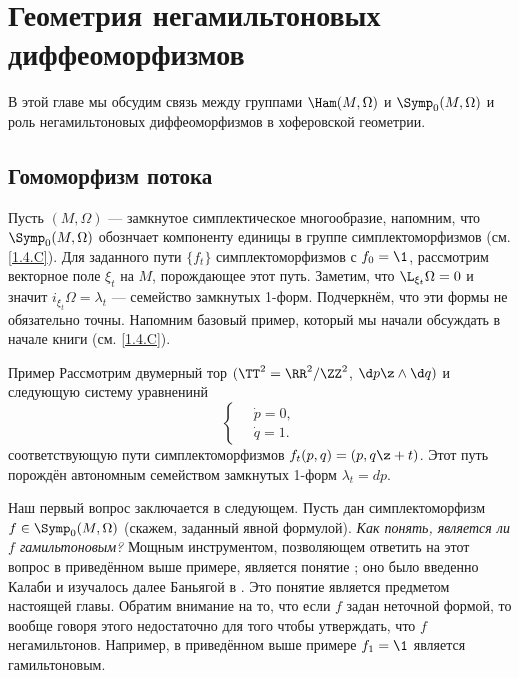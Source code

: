 \chapter[Негамильтоновы диффеоморфизмы]{Геометрия негамильтоновых диффеоморфизмов}\label{chap:14}

В этой главе мы обсудим связь между группами $\Ham(M,\Omega)$ и $\Symp_0(M,\Omega)$ и роль негамильтоновых диффеоморфизмов в хоферовской геометрии.

\section{Гомоморфизм потока}\label{sec:14.1}

Пусть $(M,\Omega)$ --- замкнутое симплектическое многообразие,
напомним, что $\Symp_0(M,\Omega)$ обознчает компоненту единицы в
группе симплектоморфизмов (см. \ref{1.4.C}).
Для заданного пути $\{f_t\}$ симплектоморфизмов с $f_0 = \1$,
рассмотрим векторное поле $\xi_t$ на $M$, порождающее этот путь.
Заметим, что $\L_{\xi_t}\Omega=0$ и значит
$i_{\xi_t}\Omega=\lambda_t$ --- семейство замкнутых 1-форм.
Подчеркнём, что эти формы не обязательно точны.
Напомним базовый пример, который мы начали обсуждать в начале книги
(см. \ref{1.4.C}). 


\begin{thm}{Пример}\label{14.1.A}
Рассмотрим двумерный тор $(\TT^2=\RR^2/\ZZ^2$, $\d p\z\wedge \d q)$ и
следующую систему уравненинй 
\[
\begin{cases}
\quad\dot p=0,
\\
\quad\dot q=1.
\end{cases}
\]
соответствующую пути симплектоморфизмов $f_t(p, q) = (p, q \z+ t)$.
Этот путь порождён автономным семейством замкнутых 1-форм $\lambda_t = dp$.
\end{thm}


Наш первый вопрос заключается в следующем.
Пусть дан симплектоморфизм $f\in\Symp_0(M,\Omega)$ (скажем, заданный
явной формулой).
\textit{Как понять, является ли $f$ гамильтоновым?}
Мощным инструментом, позволяющем ответить на этот вопрос в приведённом
выше примере, является понятие ; оно было
введенно Калаби и изучалось далее
Баньягой в \cite{B1}.
Это понятие является предметом настоящей главы.
Обратим внимание на то, что если $f$ задан неточной формой, то вообще
говоря этого недостаточно для того чтобы утверждать, что $f$
негамильтонов.
Например, в приведённом выше примере $f_1 = \1$ является гамильтоновым.

